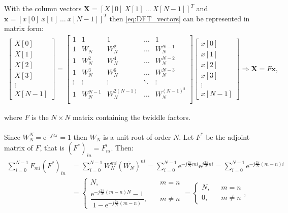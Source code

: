 With the column vectors $\textbf{X} = [X[0] \ X[1] \ \dots \ X[N-1]]^T$ and $\textbf{x} = [x[0] \ x[1] \ \dots \ x[N-1]]^T$ then \eqref{eq:DFT_vectors} can be represented in matrix form:
\begin{align} \label{eq:DFT_matrix}
	\begin{bmatrix}
		X[0]\\ X[1]\\ X[2]\\ X[3] \\ \vdots \\ X[N-1]
	\end{bmatrix}
	=
	\begin{bmatrix}
		1 & 1 	& 1   	& \hdots & 1\\
		1 & W_N 	& W_N^2 	& \hdots & W_N^{N-1} \\
		1 & W_N^2	& W_N^4	& \hdots & W_N^{N-2} \\
		1 & W_N^3	& W_N^6	& \hdots & W_N^{N-3} \\
		\vdots & \vdots & \vdots & \ddots & \vdots \\
		1 & W_N^{N-1}	& W_N^{2(N-1)}	& \hdots & 						W_N^{(N-1)^2} \\
	\end{bmatrix}
	\begin{bmatrix}
		x[0]\\ x[1]\\ x[2]\\ x[3]\\ \vdots \\ x[N-1]
	\end{bmatrix}
	\Rightarrow
	\textbf{X} = F\textbf{x},
\end{align}

where $F$ is the $N \times N$ matrix containing the twiddle factors.
\\ \\
Since $W_N^N = \text{e}^{-j2\pi} = 1$ then $W_N$ is a unit root of order $N$. Let $F^*$ be the adjoint matrix of $F$, that is $(F^*)_{in} = \overline{F_{ni}}$. Then:
\begin{align*}
\sum_{i=0}^{N-1} F_{mi} (F^*)_{in} &= \sum_{i=0}^{N-1} W_N^{mi} (\overline{W_N})^{ni} = \sum_{i=0}^{N-1} \text{e}^{-j\frac{2\pi}{N}mi} \text{e}^{j\frac{2\pi}{N}ni} = \sum_{i=0}^{N-1} \text{e}^{-j\frac{2\pi}{N}(m-n)i} \\ &=
\begin{cases}
N, &m = n \\
\dfrac{\text{e}^{-j\frac{2\pi}{N}(m-n)N}-1}{1-\text{e}^{-j\frac{2\pi}{N}(m-n)}}, \quad &m \neq n
\end{cases} =
\begin{cases}
N, &m = n \\
0, \quad &m \neq n
\end{cases},
\end{align*}


